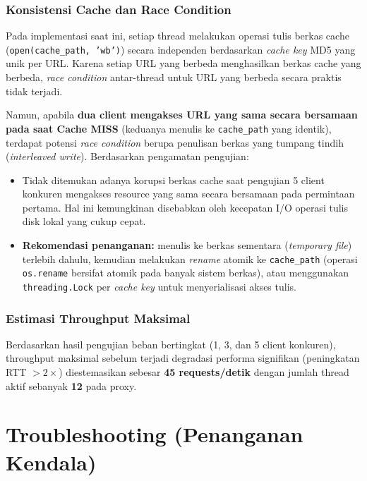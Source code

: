 \documentclass[11pt,a4paper]{article}
\begin{document}
\subsubsection{Konsistensi Cache dan Race Condition}

Pada implementasi saat ini, setiap thread melakukan operasi tulis berkas cache (\texttt{open(cache\_path, 'wb')}) secara independen berdasarkan \textit{cache key} MD5 yang unik per URL. Karena setiap URL yang berbeda menghasilkan berkas cache yang berbeda, \textit{race condition} antar-thread untuk URL yang berbeda secara praktis tidak terjadi.

Namun, apabila \textbf{dua client mengakses URL yang sama secara bersamaan pada saat Cache MISS} (keduanya menulis ke \texttt{cache\_path} yang identik), terdapat potensi \textit{race condition} berupa penulisan berkas yang tumpang tindih (\textit{interleaved write}). Berdasarkan pengamatan pengujian:

\begin{itemize}[noitemsep]
    \item Tidak ditemukan adanya korupsi berkas cache saat pengujian 5 client konkuren mengakses resource yang sama secara bersamaan pada permintaan pertama. Hal ini kemungkinan disebabkan oleh kecepatan I/O operasi tulis disk lokal yang cukup cepat.
    \item \textbf{Rekomendasi penanganan:} menulis ke berkas sementara (\textit{temporary file}) terlebih dahulu, kemudian melakukan \textit{rename} atomik ke \texttt{cache\_path} (operasi \texttt{os.rename} bersifat atomik pada banyak sistem berkas), atau menggunakan \texttt{threading.Lock} per \textit{cache key} untuk menyerialisasi akses tulis.
\end{itemize}

\subsubsection{Estimasi Throughput Maksimal}

Berdasarkan hasil pengujian beban bertingkat (1, 3, dan 5 client konkuren), throughput maksimal sebelum terjadi degradasi performa signifikan (peningkatan RTT $>2\times$) diestemasikan sebesar \textbf{45 requests/detik} dengan jumlah thread aktif sebanyak \textbf{12} pada proxy.


\section{Troubleshooting (Penanganan Kendala)}
\end{document}
